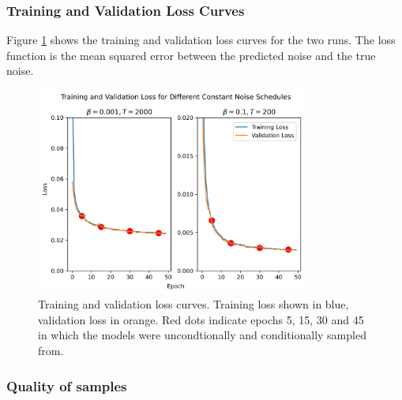 \documentclass[11pt]{article}
\begin{document}
\subsubsection{Training and Validation Loss Curves}
Figure \ref{fig:q1b_loss_curves} shows the training and validation loss curves for the two runs. The loss function is the mean squared error between the predicted noise and the true noise.
\begin{figure}[ht]
    \centering
    \includegraphics[width=0.8\textwidth]{figs/q1b_loss.png}
    \caption{Training and validation loss curves. Training loss shown in blue, validation loss in orange. Red dots indicate epochs 5, 15, 30 and 45 in which the models were uncondtionally and conditionally sampled from.}
    \label{fig:q1b_loss_curves}
\end{figure}

\subsubsection{Quality of samples}
\end{document}
